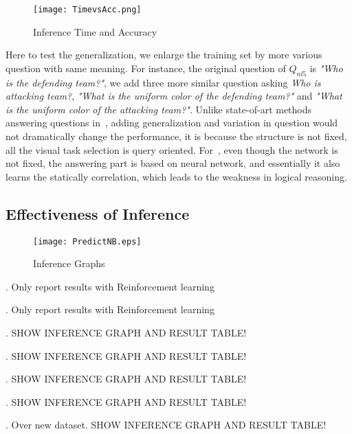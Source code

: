 \begin{figure}[h]
\begin{center}
\texttt{[image: TimevsAcc.png]}
\end{center}
\caption{Inference Time and Accuracy}
\label{fig:TimevsAcc}
\end{figure}

Here to test the generalization, we enlarge the training set by more various question with same meaning. For instance, the original question of $Q_{nl5}$ is \textit{"Who is the defending team?"}, we add three more similar question asking \textit{Who is attacking team?}, \textit{"What is the uniform color of the defending team?"} and \textit{"What is the uniform color of the attacking team?"}. Unlike state-of-art methods answering questions in~\cite{peixi2019}, adding generalization and variation in question would not dramatically change the performance, it is because the structure is not fixed, all the visual task selection is query oriented. For~\cite{hu2017learning}, even though the network is not fixed, the answering part is based on neural network, and essentially it also learns the statically correlation, which leads to the weakness in logical reasoning.

\subsection{Effectiveness of Inference} 
\begin{figure}[tb!]
\centering
\texttt{[image: PredictNB.eps]}
\vspace{-2ex}
\caption{Inference Graphs}
\vspace{-2ex}
\label{fig:inferG}
\end{figure}
. Only report results with Reinforcement learning 

. Only report results with Reinforcement learning 

. {\color{red} SHOW INFERENCE GRAPH AND RESULT TABLE!}

. {\color{red} SHOW INFERENCE GRAPH AND RESULT TABLE!}

. {\color{red} SHOW INFERENCE GRAPH AND RESULT TABLE!}

. {\color{red} SHOW INFERENCE GRAPH AND RESULT TABLE!}

. {\color{red} Over new dataset. SHOW INFERENCE GRAPH AND RESULT TABLE!}

